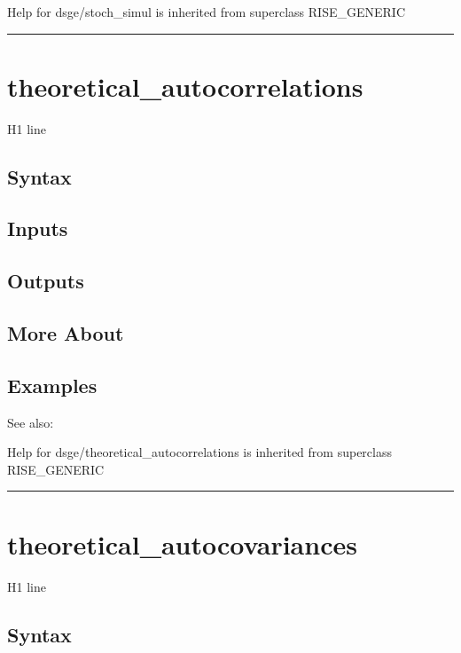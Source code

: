 \documentclass[letterpaper,10pt,english]{sphinxmanual}
\begin{document}
Help for dsge/stoch\_simul is inherited from superclass RISE\_GENERIC


\bigskip\hrule{}\bigskip



\section{theoretical\_autocorrelations}
\label{classes/models/@dsge/dsge:theoretical-autocorrelations}\label{classes/models/@dsge/dsge:id227}
H1 line


\subsection{Syntax}
\label{classes/models/@dsge/dsge:id228}

\subsection{Inputs}
\label{classes/models/@dsge/dsge:id229}

\subsection{Outputs}
\label{classes/models/@dsge/dsge:id230}

\subsection{More About}
\label{classes/models/@dsge/dsge:id231}

\subsection{Examples}
\label{classes/models/@dsge/dsge:id232}
See also:

Help for dsge/theoretical\_autocorrelations is inherited from superclass RISE\_GENERIC


\bigskip\hrule{}\bigskip



\section{theoretical\_autocovariances}
\label{classes/models/@dsge/dsge:theoretical-autocovariances}\label{classes/models/@dsge/dsge:id233}
H1 line


\subsection{Syntax}
\label{classes/models/@dsge/dsge:id234}
\end{document}

